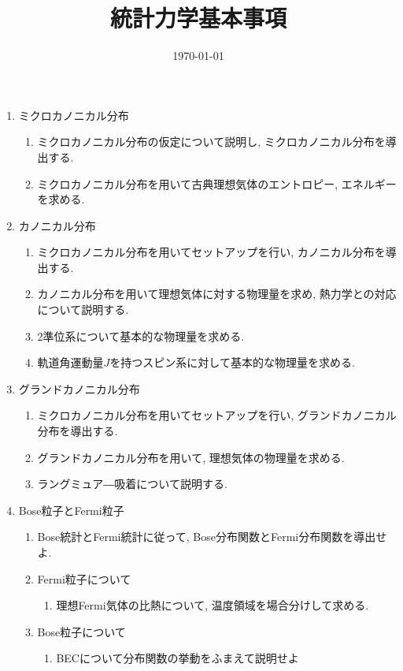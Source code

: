 \documentclass[11pt,a4paper]{jarticle}
\title{統計力学基本事項}
\author{}
\date{\today}
\begin{document}
\maketitle
\begin{enumerate}
    \item ミクロカノニカル分布
    \begin{enumerate}
        \item ミクロカノニカル分布の仮定について説明し, ミクロカノニカル分布を導出する.
        \item ミクロカノニカル分布を用いて古典理想気体のエントロピー, エネルギーを求める.
    \end{enumerate}
    \item カノニカル分布
    \begin{enumerate}
        \item ミクロカノニカル分布を用いてセットアップを行い, カノニカル分布を導出する.
        \item カノニカル分布を用いて理想気体に対する物理量を求め, 熱力学との対応について説明する.
        \item 2準位系について基本的な物理量を求める.
        \item 軌道角運動量$J$を持つスピン系に対して基本的な物理量を求める.
    \end{enumerate}
    \item グランドカノニカル分布
    \begin{enumerate}
        \item ミクロカノニカル分布を用いてセットアップを行い, グランドカノニカル分布を導出する.
        \item グランドカノニカル分布を用いて, 理想気体の物理量を求める.
        \item ラングミュア―吸着について説明する.
    \end{enumerate}
    \item Bose粒子とFermi粒子
    \begin{enumerate}
        \item Bose統計とFermi統計に従って, Bose分布関数とFermi分布関数を導出せよ.
        \item Fermi粒子について
        \begin{enumerate}
            \item 理想Fermi気体の比熱について, 温度領域を場合分けして求める.
        \end{enumerate}
        \item Bose粒子について
        \begin{enumerate}
            \item BECについて分布関数の挙動をふまえて説明せよ
        \end{enumerate}
    \end{enumerate}
\end{enumerate}
\end{document}
